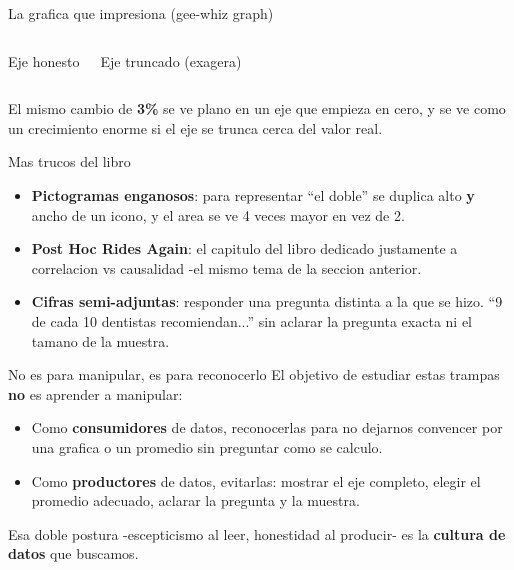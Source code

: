 \documentclass[aspectratio=169]{beamer}
\begin{document}
\begin{frame}[fragile]{La grafica que impresiona (gee-whiz graph)}
  \begin{columns}[t]
      \centering \footnotesize Eje honesto
      \centering \footnotesize Eje truncado (exagera)
  \end{columns}
  \vspace{0.3em}
  El mismo cambio de \textbf{3\%} se ve plano en un eje que empieza en cero, y
  se ve como un crecimiento enorme si el eje se trunca cerca del valor real.
\end{frame}

\begin{frame}{Mas trucos del libro}
  \begin{itemize}
    \item \textbf{Pictogramas enganosos}: para representar ``el doble'' se
          duplica alto \textbf{y} ancho de un icono, y el area se ve 4 veces
          mayor en vez de 2.
    \item \textbf{Post Hoc Rides Again}: el capitulo del libro dedicado
          justamente a correlacion vs causalidad -el mismo tema de la
          seccion anterior.
    \item \textbf{Cifras semi-adjuntas}: responder una pregunta distinta a la
          que se hizo. ``9 de cada 10 dentistas recomiendan...'' sin aclarar
          la pregunta exacta ni el tamano de la muestra.
  \end{itemize}
\end{frame}

\begin{frame}{No es para manipular, es para reconocerlo}
  El objetivo de estudiar estas trampas \textbf{no} es aprender a manipular:
  \begin{itemize}
    \item Como \textbf{consumidores} de datos, reconocerlas para no dejarnos
          convencer por una grafica o un promedio sin preguntar como se
          calculo.
    \item Como \textbf{productores} de datos, evitarlas: mostrar el eje
          completo, elegir el promedio adecuado, aclarar la pregunta y la
          muestra.
  \end{itemize}
  \vspace{0.3em}
  Esa doble postura -escepticismo al leer, honestidad al producir- es la
  \textbf{cultura de datos} que buscamos.
\end{frame}
\end{document}
